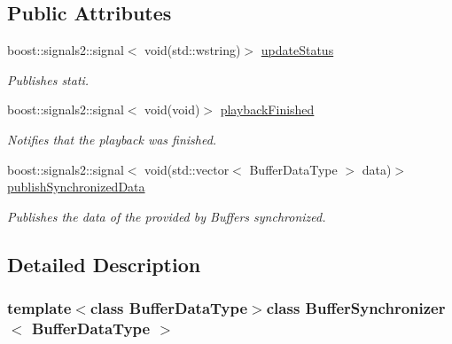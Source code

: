 \subsection*{Public Attributes}
\begin{DoxyCompactItemize}
\item 
\hypertarget{class_buffer_synchronizer_a7627fa702961a1585e6f6b79973e42cd}{}boost\+::signals2\+::signal$<$ void(std\+::wstring)$>$ \hyperlink{class_buffer_synchronizer_a7627fa702961a1585e6f6b79973e42cd}{update\+Status}\label{class_buffer_synchronizer_a7627fa702961a1585e6f6b79973e42cd}

\begin{DoxyCompactList}\small\item\em Publishes stati. \end{DoxyCompactList}\item 
\hypertarget{class_buffer_synchronizer_abd683dcc9e834c998abb2762cf49c7d3}{}boost\+::signals2\+::signal$<$ void(void)$>$ \hyperlink{class_buffer_synchronizer_abd683dcc9e834c998abb2762cf49c7d3}{playback\+Finished}\label{class_buffer_synchronizer_abd683dcc9e834c998abb2762cf49c7d3}

\begin{DoxyCompactList}\small\item\em Notifies that the playback was finished. \end{DoxyCompactList}\item 
\hypertarget{class_buffer_synchronizer_a773c3fdb260509be718d687045602fbb}{}boost\+::signals2\+::signal$<$ void(std\+::vector$<$ Buffer\+Data\+Type $>$ data)$>$ \hyperlink{class_buffer_synchronizer_a773c3fdb260509be718d687045602fbb}{publish\+Synchronized\+Data}\label{class_buffer_synchronizer_a773c3fdb260509be718d687045602fbb}

\begin{DoxyCompactList}\small\item\em Publishes the data of the provided by Buffers synchronized. \end{DoxyCompactList}\end{DoxyCompactItemize}


\subsection{Detailed Description}
\subsubsection*{template$<$class Buffer\+Data\+Type$>$class Buffer\+Synchronizer$<$ Buffer\+Data\+Type $>$}

